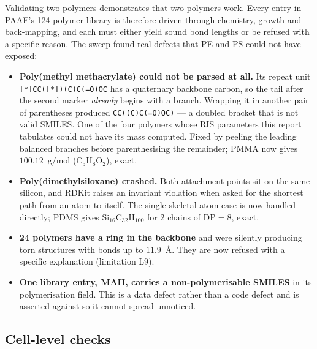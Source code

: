\documentclass[11pt,a4paper]{article}
\begin{document}
Validating two polymers demonstrates that two polymers work. Every entry in
PAAF's 124-polymer library is therefore driven through chemistry, growth and
back-mapping, and each must either yield sound bond lengths or be refused with
a specific reason. The sweep found real defects that PE and PS could not have
exposed:

\begin{itemize}
\item \textbf{Poly(methyl methacrylate) could not be parsed at all.} Its
      repeat unit \texttt{[*]CC([*])(C)C(=O)OC} has a quaternary backbone
      carbon, so the tail after the second marker \emph{already} begins with a
      branch. Wrapping it in another pair of parentheses produced
      \texttt{CC((C)C(=O)OC)} --- a doubled bracket that is not valid SMILES.
      One of the four polymers whose RIS parameters this report tabulates
      could not have its mass computed. Fixed by peeling the leading balanced
      branches before parenthesising the remainder; PMMA now gives
      $100.12$~g/mol (C$_5$H$_8$O$_2$), exact.
\item \textbf{Poly(dimethylsiloxane) crashed.} Both attachment points sit on
      the same silicon, and RDKit raises an invariant violation when asked for
      the shortest path from an atom to itself. The single-skeletal-atom case
      is now handled directly; PDMS gives Si$_{16}$C$_{32}$H$_{100}$ for
      2 chains of $\mathrm{DP}=8$, exact.
\item \textbf{24 polymers have a ring in the backbone} and were silently
      producing torn structures with bonds up to $11.9$~\AA. They are now
      refused with a specific explanation (limitation L9).
\item \textbf{One library entry, MAH, carries a non-polymerisable SMILES} in
      its polymerisation field. This is a data defect rather than a code
      defect and is asserted against so it cannot spread unnoticed.
\end{itemize}

\subsection{Cell-level checks}
\end{document}
